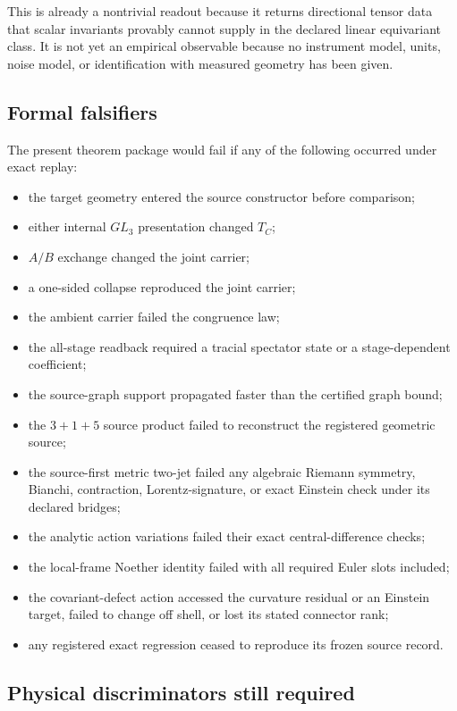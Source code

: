 \documentclass[11pt]{article}
\theoremstyle{definition}
\theoremstyle{remark}
\begin{document}
This is already a nontrivial readout because it returns directional tensor data that scalar invariants provably cannot supply in the declared linear equivariant class. It is not yet an empirical observable because no instrument model, units, noise model, or identification with measured geometry has been given.

\subsection{Formal falsifiers}

The present theorem package would fail if any of the following occurred under exact replay:
\begin{itemize}
\item the target geometry entered the source constructor before comparison;
\item either internal $GL_3$ presentation changed $T_C$;
\item $A/B$ exchange changed the joint carrier;
\item a one-sided collapse reproduced the joint carrier;
\item the ambient carrier failed the congruence law;
\item the all-stage readback required a tracial spectator state or a stage-dependent coefficient;
\item the source-graph support propagated faster than the certified graph bound;
\item the $3+1+5$ source product failed to reconstruct the registered geometric source;
\item the source-first metric two-jet failed any algebraic Riemann symmetry, Bianchi, contraction, Lorentz-signature, or exact Einstein check under its declared bridges;
\item the analytic action variations failed their exact central-difference checks;
\item the local-frame Noether identity failed with all required Euler slots included;
\item the covariant-defect action accessed the curvature residual or an Einstein target, failed to change off shell, or lost its stated connector rank;
\item any registered exact regression ceased to reproduce its frozen source record.
\end{itemize}

\subsection{Physical discriminators still required}
\end{document}

